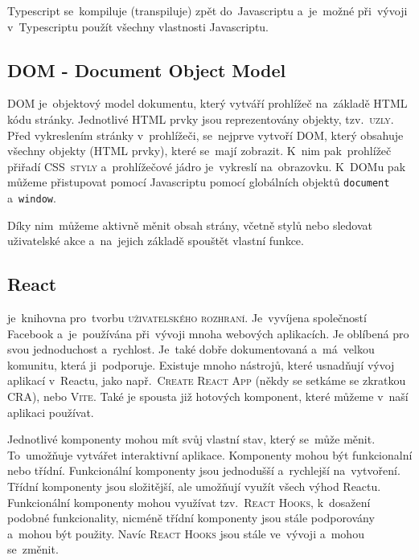 \documentclass[14pt,a4paper]{article}
\begin{document}
        Typescript se~kompiluje (transpiluje) zpět do~Javascriptu a~je~možné při~vývoji v~Typescriptu použít všechny vlastnosti Javascriptu. \parencite[Get started/TypeScript for the New Programmer]{TypeScript}

        \subsection{DOM - Document Object Model}
        DOM je~objektový model dokumentu, který vytváří prohlížeč na~základě HTML kódu stránky. Jednotlivé HTML prvky jsou reprezentovány objekty, tzv.~\textsc{uzly}. Před vykreslením stránky v~prohlížeči, se~nejprve vytvoří DOM, který obsahuje všechny objekty (HTML prvky), které se~mají zobrazit. K~nim pak~prohlížeč přiřadí \textsc{CSS~styly} a~prohlížečové jádro je~vykreslí na~obrazovku. K~DOMu pak můžeme přistupovat pomocí Javascriptu pomocí globálních objektů \texttt{document} a~\texttt{window}.
        
        Díky nim~můžeme aktivně měnit obsah strány, včetně stylů nebo sledovat uživatelské akce a~na~jejich základě spouštět vlastní funkce.\parencite[2.1.01]{kantor_javascript}

        \subsection{React} je~knihovna pro~tvorbu \textsc{uživatelského rozhraní}. Je~vyvíjena společností Facebook a~je~používána při~vývoji mnoha webových aplikacích.
        Je oblíbená pro svou jednoduchost a~rychlost. Je~také dobře dokumentovaná a~má~velkou komunitu, která ji~podporuje.
        Existuje mnoho nástrojů, které usnadňují vývoj aplikací v~Reactu, jako
        např.~\textsc{Create React App} (někdy se setkáme se zkratkou CRA), nebo \textsc{Vite}.
        Také je spousta již hotových komponent, které můžeme v~naší aplikaci používat.

        Jednotlivé komponenty mohou mít svůj vlastní stav, který se~může měnit. To~umožňuje vytvářet interaktivní aplikace.
        Komponenty mohou být funkcionalní nebo třídní. Funkcionální komponenty jsou jednodušší a~rychlejší na~vytvoření.
        Třídní komponenty jsou složitější, ale umožňují využít všech výhod Reactu. Funkcionální komponenty mohou využívat tzv.~\textsc{React Hooks}, k~dosažení podobné funkcionality, nicméně třídní komponenty jsou stále podporovány a~mohou být použity.
        Navíc \textsc{React Hooks} jsou stále ve~vývoji a~mohou se~změnit.
\end{document}
